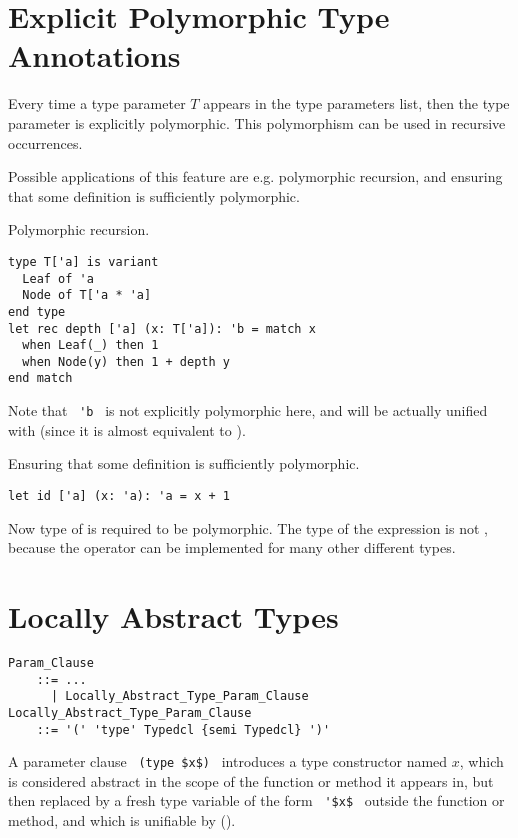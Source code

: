 \section{Explicit Polymorphic Type Annotations}
\label{sec:explicit-polymorphic-type-annotations}

Every time a type parameter $T$ appears in the type parameters list, then the type parameter is explicitly polymorphic. This polymorphism can be used in recursive occurrences. 

Possible applications of this feature are e.g. polymorphic recursion, and ensuring that some definition is sufficiently polymorphic.

\example Polymorphic recursion.
\begin{lstlisting}
type T['a] is variant
  Leaf of 'a
  Node of T['a * 'a]
end type
let rec depth ['a] (x: T['a]): 'b = match x
  when Leaf(_) then 1
  when Node(y) then 1 + depth y
end match
\end{lstlisting}
Note that ~\lstinline!'b!~ is not explicitly polymorphic here, and will be actually unified with  (since it is almost equivalent to ). 

\example Ensuring that some definition is sufficiently polymorphic.
\begin{lstlisting}
let id ['a] (x: 'a): 'a = x + 1 
\end{lstlisting}
Now type of  is required to be polymorphic. The type of the expression  is not , because the operator \code{+} can be implemented for many other different types.





\section{Locally Abstract Types}
\label{sec:locally-abstract-types}

\grammar\begin{lstlisting}
Param_Clause 
    ::= ...
      | Locally_Abstract_Type_Param_Clause
Locally_Abstract_Type_Param_Clause 
    ::= '(' 'type' Typedcl {semi Typedcl} ')'
\end{lstlisting}

A parameter clause ~\lstinline!(type $x$)!~ introduces a type constructor named $x$, which is considered abstract in the scope of the function or method it appears in, but then replaced by a fresh type variable of the form ~\lstinline!'$x$!~ outside the function or method, and which is unifiable by ().

